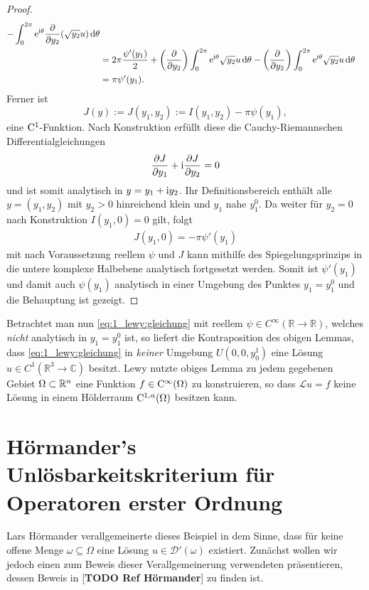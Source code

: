 \begin{proof}
\begin{align}
\begin{split}
	- \int_0^{2\pi} \mathrm e^{\mathrm i\theta}\frac{\partial}{\partial y_2}(\sqrt{y_2} u) \,\mathrm d\theta \\
&= 2\pi\frac{\psi'(y_1)}{2}
	+  \left(\frac{\partial}{\partial y_2}\right)\int_0^{2\pi} \mathrm e^{\mathrm i\theta}\sqrt{y_2}u\,\mathrm d\theta
	- \left(\frac{\partial}{\partial y_2}\right) \int_0^{2\pi} \mathrm e^{\mathrm i\theta}\sqrt{y_2}u\,\mathrm d\theta\\
&= \pi\psi'(y_1).
\end{split}
\end{align}
Ferner ist
\begin{equation}
J(y):=J(y_1,y_2):=I(y_1,y_2)-\pi\psi(y_1),
\end{equation}
eine $\mathrm C^1$-Funktion. Nach Konstruktion erfüllt diese die Cauchy-Riemannschen Differentialgleichungen
\begin{equation}
\frac{\partial J}{\partial y_1} +\mathrm i\frac{\partial J}{\partial y_2} = 0
\end{equation}
 und ist somit analytisch in $y=y_1+\mathrm i y_2$. Ihr Definitionsbereich enthält alle $y=(y_1,y_2)$ mit $y_2>0$ hinreichend klein und $y_1$ nahe $y_1^0$.
 Da weiter für $y_2=0$ nach Konstruktion $I(y_1,0)=0$ gilt, folgt
\begin{align*}
 J(y_1,0)=-\pi\psi'(y_1)
\end{align*}
mit nach Voraussetzung reellem $\psi$ und $J$ kann mithilfe des Spiegelungsprinzips in die untere komplexe Halbebene analytisch fortgesetzt werden. Somit ist $\psi'(y_1)$ 
und damit auch $\psi(y_1)$ analytisch in einer Umgebung des Punktes $y_1=y_1^0$ und die Behauptung ist gezeigt.
\end{proof}

Betrachtet man nun \eqref{eq:1_lewy:gleichung} mit reellem $\psi\in C^\infty(\mathbb{R}\rightarrow\mathbb{R})$, welches \textit{nicht} analytisch in $y_1=y_1^0$ ist, so liefert die Kontraposition des obigen Lemmas, dass \eqref{eq:1_lewy:gleichung} in \textit{keiner} Umgebung $U(0,0,y_0^1)$ eine Lösung $u\in C^1(\mathbb{R}^3\rightarrow\mathbb{C})$ besitzt. Lewy nutzte obiges Lemma zu jedem gegebenen Gebiet $\Omega\subset\mathbb R^n$ eine Funktion $f\in\mathrm C^\infty(\Omega)$ zu konstruieren, so dass $\mathscr Lu=f$ keine Lösung in einem Hölderraum $\mathrm C^{1,\alpha}(\Omega)$ besitzen kann.




\section{Hörmander's Unlösbarkeitskriterium für Operatoren erster Ordnung}
Lars Hörmander verallgemeinerte dieses Beispiel in dem Sinne, dass für keine offene Menge $\omega\subseteq\Omega$ eine Lösung $u\in\mathscr{D}'(\omega)$ existiert. Zunächst wollen wir jedoch einen zum Beweis dieser Verallgemeinerung verwendeten präsentieren, dessen Beweis in [\textbf{TODO Ref Hörmander}] zu finden ist.

